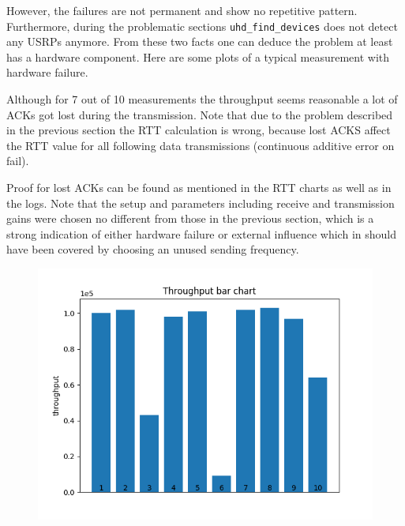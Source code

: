 \documentclass{article}
\begin{document}
However, the failures are not permanent and show no repetitive pattern. Furthermore, during the problematic sections \texttt{uhd\_find\_devices} does not detect any USRPs anymore. From these two facts one can deduce the problem at least has a hardware component. Here are some plots of a typical measurement with hardware failure. 

\bigskip

Although for 7 out of 10 measurements the throughput seems reasonable a lot of ACKs got lost during the transmission. Note that due to the problem described in the previous section the RTT calculation is wrong, because lost ACKS affect the RTT value for all following data transmissions (continuous additive error on fail). 

\bigskip

Proof for lost ACKs can be found as mentioned in the RTT charts as well as in the logs. Note that the setup and parameters including receive and transmission gains were chosen no different from those in the previous section, which is a strong indication of either hardware failure or external influence which in should have been covered by choosing an unused sending frequency. 

\begin{figure}[h] \label{usrp-fails2-1}
	\includegraphics[width=\textwidth]{usrp_fail2_tp_bar}
	
\end{figure}
\end{document}

